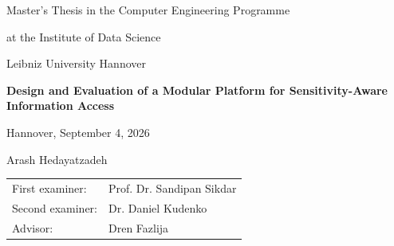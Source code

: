 \documentclass[
  12pt,
  a4paper,
  oneside,
  openany
]{report}
\newcommand{\thesistitle}{Design and Evaluation of a Modular Platform for Sensitivity-Aware Information Access}
\newcommand{\thesisauthor}{Arash Hedayatzadeh}
\newcommand{\studentid}{}
\newcommand{\universityname}{Leibniz University Hannover}
\newcommand{\institutename}{Institute of Data Science}
\newcommand{\firstexaminername}{Prof. Dr. Sandipan Sikdar}
\newcommand{\secondexaminername}{Dr. Daniel Kudenko}
\newcommand{\advisorname}{Dren Fazlija}
\newcommand{\submissiondate}{September 4, 2026}
\begin{document}
\hypersetup{pageanchor=false}
\begin{titlepage}
  \thispagestyle{empty}
  \begin{center}
    \vspace*{18mm}

    {\large Master's Thesis in the Computer Engineering Programme\par}

    \vspace{12mm}

    {\normalsize at the \institutename\par}
    \vspace{2mm}
    {\normalsize \universityname\par}

    \vfill

    {\LARGE\bfseries \thesistitle\par}

    \vspace{15mm}

    {\large Hannover, \submissiondate\par}

    \vspace{8mm}

    {\normalsize \thesisauthor\par}
    \ifdefempty{\studentid}{}{\vspace{1mm}{\normalsize \studentid\par}}

    \vfill

    \begin{tabular}{@{}p{35mm}l@{}}
      First examiner:  & \firstexaminername \\
      Second examiner: & \secondexaminername \\
      Advisor:         & \advisorname
    \end{tabular}

    \vspace*{15mm}
  \end{center}
\end{titlepage}
\hypersetup{pageanchor=true}




\tableofcontents
\clearpage
\listoftables
\clearpage
\listoffigures
\clearpage
\end{document}
